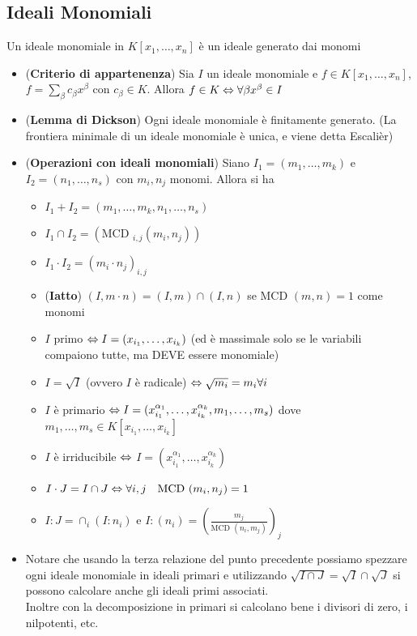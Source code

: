 \documentclass[a4paper,NoNotes,GeneralMath]{stdmdoc}
\newcommand{\MCD}{\text{MCD }}
\begin{document}
	\subsection*{Ideali Monomiali}
	Un ideale monomiale in $K[x_1, \ldots, x_n]$ è un ideale generato dai monomi
	\begin{itemize}
		\item ({\bf Criterio di appartenenza}) Sia $I$ un ideale monomiale e $f \in K[x_1, \ldots, x_n]$, $f = \sum_\beta c_\beta x^\beta$ con $c_\beta \in K$. Allora $f \in K \Leftrightarrow \forall \beta x^\beta \in I$
		\item ({\bf Lemma di Dickson}) Ogni ideale monomiale è finitamente generato. (La frontiera minimale di un ideale monomiale è unica, e viene detta Escalièr)
		\item ({\bf Operazioni con ideali monomiali}) Siano $I_1 = (m_1, \ldots, m_k)$ e $I_2 = (n_1, \ldots, n_s)$ con $m_i, n_j$ monomi. Allora si ha
			\begin{itemize}
				\item $I_1 + I_2 = (m_1, \ldots, m_k, n_1, \ldots, n_s)$
				\item $I_1 \cap I_2 = (\MCD_{i,j} (m_i, n_j))$
				\item $I_1 \cdot I_2 = (m_i \cdot n_j)_{i,j}$
				\item ({\bf Iatto}) $(I, m \cdot n) = (I, m) \cap (I, n)$ se $\MCD(m, n) = 1$ come monomi
				\item $I$ primo $\Leftrightarrow I = (x_{i_1}, \ldots, x_{i_k})$ (ed è massimale solo se le variabili compaiono tutte, ma DEVE essere monomiale)
				\item $I = \sqrt{I}$ (ovvero $I$ è radicale) $\Leftrightarrow \sqrt{m_i} = m_i \forall i$
				\item $I$ è primario $\Leftrightarrow I = (x_{i_1}^{\alpha_1}, \ldots, x_{i_k}^{\alpha_k}, m_1, \ldots, m_s)$ dove $m_1, \ldots, m_s \in K[x_{i_1}, \ldots, x_{i_k}]$
				\item $I$ è irriducibile $\Leftrightarrow$ $I = (x_{i_1}^{\alpha_1}, \ldots, x_{i_k}^{\alpha_k})$
				\item $I\cdot J = I \cap J \sse \forall i,j \quad \MCD(m_i, n_j) = 1$
				\item $I : J = \cap_i (I : n_i)$ e $I : (n_i) = (\frac{m_j}{\MCD(n_i, m_j)})_{j}$
			\end{itemize}
		\item Notare che usando la terza relazione del punto precedente possiamo spezzare ogni ideale monomiale in ideali primari e utilizzando $\sqrt{I \cap J} = \sqrt{I} \cap \sqrt{J}$ si possono calcolare anche gli ideali primi associati. \\
			Inoltre con la decomposizione in primari si calcolano bene i divisori di zero, i nilpotenti, etc.
	\end{itemize}
	
\end{document}
